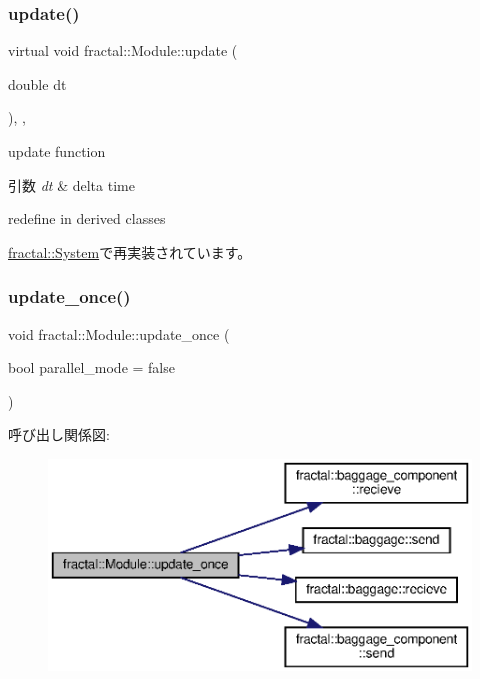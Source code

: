 \mbox{\label{classfractal_1_1Module_ad68342ebc960bb0e1dd19b7c70bc3753}} 
\subsubsection{\texorpdfstring{update()}{update()}}
{\footnotesize\ttfamily virtual void fractal\+::\+Module\+::update (\begin{DoxyParamCaption}\item[{double}]{dt }\end{DoxyParamCaption})\hspace{0.3cm}{\ttfamily [inline]}, {\ttfamily [protected]}, {\ttfamily [virtual]}}



update function 


\begin{DoxyParams}{引数}
{\em dt} & delta time\\
\hline
\end{DoxyParams}
redefine in derived classes 

\hyperlink{classfractal_1_1System_a86fe5dae233bd52be06fe950087787d9}{fractal\+::\+System}で再実装されています。

\mbox{\label{classfractal_1_1Module_abc2bf9795de848ecef0bd2e339a81e0d}} 
\subsubsection{\texorpdfstring{update\+\_\+once()}{update\_once()}}
{\footnotesize\ttfamily void fractal\+::\+Module\+::update\+\_\+once (\begin{DoxyParamCaption}\item[{bool}]{parallel\+\_\+mode = {\ttfamily false} }\end{DoxyParamCaption})\hspace{0.3cm}{\ttfamily [inline]}}

呼び出し関係図\+:
\nopagebreak
\begin{figure}[H]
\begin{center}
\leavevmode
\includegraphics[width=350pt]{classfractal_1_1Module_abc2bf9795de848ecef0bd2e339a81e0d_cgraph}
\end{center}
\end{figure}


